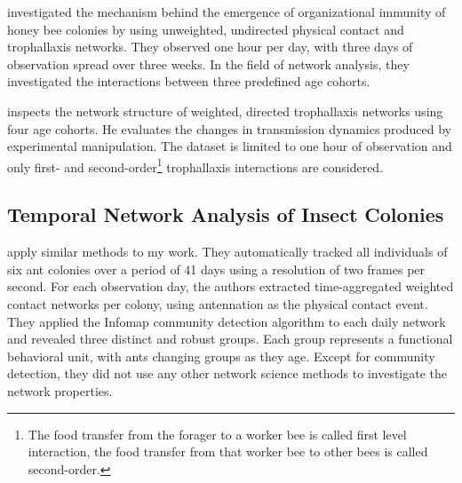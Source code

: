 
\textcite{scholl2011olfactory} investigated the mechanism behind the emergence of organizational immunity of honey bee colonies by using unweighted, undirected physical contact and trophallaxis networks.
They observed one hour per day, with three days of observation spread over three weeks.
In the field of network analysis, they investigated the interactions between three predefined age cohorts.


\textcite{naug2008structure} inspects the network structure of weighted, directed trophallaxis networks using four age cohorts.
He evaluates the changes in transmission dynamics produced by experimental manipulation.
The dataset is limited to one hour of observation and only first- and second-order\footnote{The food transfer from the forager to a worker bee is called first level interaction, the food transfer from that worker bee to other bees is called second-order.} trophallaxis interactions are considered.


\subsection{Temporal Network Analysis of Insect Colonies}

\textcite{mersch2013tracking} apply similar methods to my work.
They automatically tracked all individuals of six ant colonies over a period of 41 days using a resolution of two frames per second.
For each observation day, the authors extracted time-aggregated weighted contact networks per colony, using antennation as the physical contact event.
They applied the Infomap community detection algorithm to each daily network and revealed three distinct and robust groups.
Each group represents a functional behavioral unit, with ants changing groups as they age.
Except for community detection, they did not use any other network science methods to investigate the network properties.


